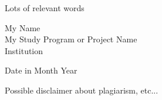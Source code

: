 \begin{titlepage}
  \center
  
  \vspace*{3cm}

  {
    \begin{spacing}{1.2}
      \LARGE Lots of relevant words
    \end{spacing}
  }

  \vfill\vfill

  My Name\\
  My Study Program or Project Name\\
  Institution

  Date in Month Year

  Possible disclaimer about plagiarism, etc...
  
  \vfill

\end{titlepage}

